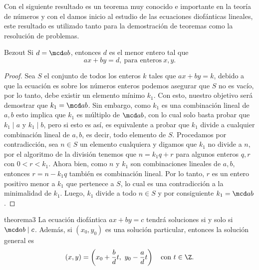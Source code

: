 \documentclass[12pt]{article}
\begin{document}
    Con el siguiente resultado es un teorema muy conocido e importante en la teoría de números y con el damos inicio al
    estudio de las ecuaciones diofánticas lineales, este resultado es utilizado tanto para la demostración de teoremas como
    la resolución de problemas.
    \begin{theorem.box}{Bezout}{}
        Si $d = \mcd a b$, entonces $d$ es el menor entero tal que
        \[
            ax + by = d,\ \text{para enteros}\ x,y.
        \]
    \end{theorem.box}
    \begin{proof}
        Sea $S$ el conjunto de todos los enteros $k$ tales que $ax + by = k$, debido a que la ecuación es sobre los números
        enteros podemos asegurar que $S$ no es vacío, por lo tanto, debe existir un elemento mínimo $k_1$.
        Con esto, nuestro objetivo será demostrar que $k_1 = \mcd a b$.
        Sin embargo, como $k_1$ es una combinación lineal de $a,b$ esto implica que $k_1$ es múltiplo de $\mcd a b$,
        con lo cual solo basta probar que $k_1 \mid a$ y $k_1 \mid b$, pero si esto es así, es equivalente a probar que
        $k_1$ divide a cualquier combinación lineal de $a,b$, es decir, todo elemento de $S$.
        Procedamos por contradicción, sea $n \in S$ un elemento cualquiera y digamos que $k_1$ no divide a $n$, por el
        algoritmo de la división tenemos que $n = k_1 q + r$ para algunos enteros $q, r$ con $0 < r < k_1$.
        Ahora bien, como $n$ y $k_1$ son combinaciones lineales de $a,b$, entonces $r = n - k_1 q$ también es combinación lineal.
        Por lo tanto, $r$ es un entero positivo menor a $k_1$ que pertenece a $S$, lo cual es una contradicción a la minimalidad de $k_1$.
        Luego, $k_1$ divide a todo $n \in S$ y por consiguiente $k_1 = \mcd a b$.
    \end{proof}

    \begin{theorem.box}{}{theorema3}
        La ecuación diofántica $ax + by = c$ tendrá soluciones si y solo si $\mcd a b \mid c$.
        Además, si $(x_0,y_0)$ es una solución particular, entonces la solución general es
        \[
            (x,y) = \left(x_0+\frac{b}{d}t,\ y_0 -\frac{a}{d}t\right) \quad \text{con}\ t \in \Z.
        \]
    \end{theorem.box}
\end{document}
